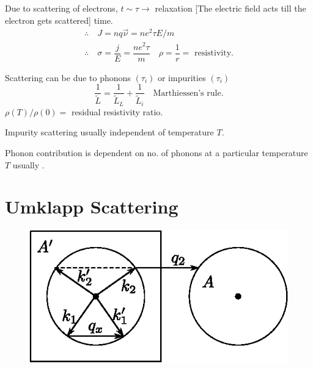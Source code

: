 Due to scattering of electrons, $t\sim \tau\to$ relaxation [The electric field acts till the electron gets scattered] time.
\begin{gather*}
\therefore\quad J=nq\overrightarrow{\nu}=ne^{2}\tau E/m\\
\therefore\quad \sigma =\dfrac{j}{E}=\dfrac{ne^{2}\tau}{m}\quad \rho=\dfrac{1}{r}=\text{ resistivity.}
\end{gather*}

Scattering can be due to phonons $(\tau_{i})$ or impurities $(\tau_{i})$
$$
\dfrac{1}{\widetilde{L}}=\dfrac{1}{\widetilde{L}_{L}}+\dfrac{1}{\widetilde{L}_{i}}\quad \text{Marthiessen's rule.}
$$
$\rho(T)/\rho(0)=$ residual resistivity ratio.

Impurity scattering usually independent of temperature $T$.

Phonon contribution is dependent on no. of phonons at a particular temperature $T$ usually .

\section*{Umklapp Scattering}
\begin{figure}[H]
\centering
\includegraphics{images/lecture25/fig1.eps}
\end{figure}

